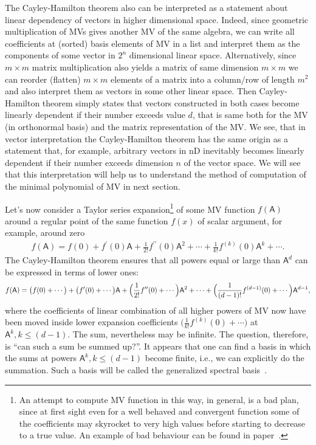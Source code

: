 \documentclass[AMA,STIX1COL]{WileyNJD-v2}
\def\m#1{\mathsf{#1}} %
\def\m#1{\mathsf{#1}}%
\begin{document}
The Cayley-Hamilton theorem also can be interpreted as a statement about linear dependency of vectors in higher dimensional space. Indeed, since geometric multiplication of MVs gives another MV of the same algebra, we can write all coefficients at (sorted) basis elements of MV in
a list and interpret them as the components of some vector in $2^n$ dimensional linear space. Alternatively, since $m\times m$ matrix
multiplication also yields a matrix of same dimension $m\times m$ we can reorder (flatten) $m\times m$ elements of a matrix into a column/row of
length $m^2$ and also interpret them as vectors in some other linear space. Then Cayley-Hamilton theorem simply states that vectors constructed
in both cases become linearly dependent if their number exceeds value $d$, that is same both for the MV (in orthonormal basis) and the matrix
representation of the MV. We see, that in vector interpretation the Cayley-Hamilton theorem has the same origin as a statement that, for example,
arbitrary vectors in nD inevitably becomes linearly dependent if their number exceeds dimension $n$ of the vector space. We will see
that this interpretation will help us to understand the method of computation of the minimal polynomial of MV in  next section.

Let's now consider a Taylor series expansion\footnote{An attempt to compute MV function in this way, in general,  is a bad plan, since at first
sight even for a well behaved and convergent function some of the  coefficients may skyrocket to very high values before starting to decrease to
a true value. An example of bad behaviour can be found in paper~\cite{Acus2022}.} of some MV function $f(\m{A})$ around a regular point of
the same function $f(x)$ of scalar argument, for example, around zero
\begin{align}\label{fTaylor}
  f(\m{A})=f(0)+ f^\prime(0)\m{A}+ \frac{1}{2!}f^{\prime\prime}(0)\m{A}^2+\cdots +
  \frac{1}{k!}f^{(k)}(0)\m{A}^{k}+\cdots.
\end{align}
The Cayley-Hamilton theorem ensures that all powers equal or large than $\m{A}^{d}$ can be expressed in terms of lower ones:
\begin{align}\label{fTaylorMaxd}
  f(\m{A})=\bigl(f(0)+\cdots\bigr) + \bigl(f^\prime(0)+\cdots\bigr)\m{A}+ \Bigl(\frac{1}{2!}f^{\prime\prime}(0)+\cdots\Bigr)\m{A}^2+\cdots +
  \Bigl(\frac{1}{(d-1)!}f^{(d-1)}(0)+\cdots\Bigr)\m{A}^{d-1},
\end{align}
where the coefficients of linear combination of all higher powers
of MV now have been  moved inside lower expansion coefficients
$\bigl(\frac{1}{k!}f^(k)(0)+\cdots\bigr)$  at $\m{A}^k,
k\le(d-1)$. The sum, nevertheless may be infinite. The question,
therefore, is ``can such a sum be summed up?''. It appears that one can
find a basis in which the sums at powers $\m{A}^k, k\le(d-1)$
become finite, i.e., we can explicitly do the summation. Such a
basis will be called the generalized spectral basis~\cite{Sobczyk1997}.
\end{document}
